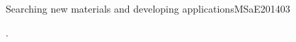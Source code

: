 \begin{syllabus}
\begin{unit}{}{Searching new materials and developing applications}{MSaE2014}{0}{3}
\begin{learningoutcomes}
      \item . %
   \end{learningoutcomes}
\end{unit}











\begin{coursebibliography}
\end{coursebibliography}

\end{syllabus}


